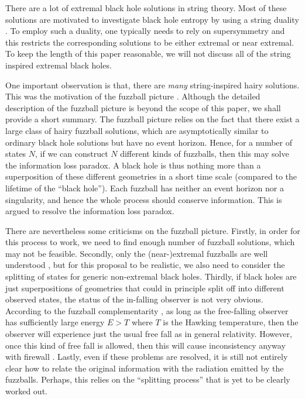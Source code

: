 \documentclass[12pt]{article}
\newcommand{\2}{$^2$}
\newcommand{\3}{$^3$}
\newcommand{\4}{$_4$}
\newcommand{\5}{$_5$}
\begin{document}
There are a lot of extremal black hole solutions in string theory. Most of these solutions are motivated to investigate black hole entropy by using a string duality \cite{Strominger:1996sh}. To employ such a duality, one typically needs to rely on supersymmetry and this restricts the corresponding solutions to be either extremal or near extremal. To keep the length of this paper reasonable, we will not discuss all of the string inspired extremal black holes.

One important observation is that, there are \emph{many} string-inspired hairy solutions. This was the motivation of the fuzzball picture \cite{Mathur:2005zp}. Although the detailed description of the fuzzball picture is beyond the scope of this paper, we shall provide a short summary. The fuzzball picture relies on the fact that there exist a large class of hairy fuzzball solutions, which are asymptotically similar to ordinary black hole solutions but have no event horizon. Hence, for a number of states $N$, if we can construct $N$ different kinds of fuzzballs, then this may solve the information loss paradox. A black hole is thus nothing more than a superposition of these different geometries in a short time scale (compared to the lifetime of the ``black hole''). Each fuzzball has neither an event horizon nor a singularity, and hence the whole process should conserve information. This is argued to resolve the information loss paradox.

There are nevertheless  some criticisms on the fuzzball picture. Firstly, in order for this process to work, we need to find enough number of fuzzball solutions, which may not be feasible. Secondly, only the (near-)extremal fuzzballs are well understood \cite{1208.3468}, but for this proposal to be realistic, we also need to consider the splitting of states for generic non-extremal black holes. Thirdly, if  black holes are just superpositions of geometries that could in principle split off into different observed states, the status of the in-falling observer is not very obvious. According to the fuzzball complementarity \cite{Mathur:2012jk, Chowdhury:2012vd}, as long as the free-falling observer has sufficiently large energy $E > T$ where $T$ is the Hawking temperature, then the observer will experience just the usual free fall as in general relativity. However, once this kind of free fall is allowed, then this will cause inconsistency anyway with firewall \cite{apologia, Hwang:2012nn}. Lastly, even if these problems are resolved, it is still not entirely clear how to relate the original information with the radiation emitted by the fuzzballs. Perhaps, this relies on the ``splitting process'' that is yet to be clearly worked out.
\end{document}
